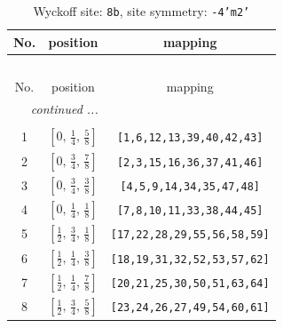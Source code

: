 \documentclass[fleqn,8pt]{jsarticle}
\begin{document}
\begin{longtable}{ccc}
\caption{Wyckoff site: {\tt 8b}, site symmetry: {\tt -4'm2'}}
 \\
 \hline \hline
No. & position & mapping \\ \hline \endfirsthead

\multicolumn{2}{l}{\tablename\ \thetable{}} \\
 \hline \hline
No. & position & mapping \\ \hline \endhead

 \hline \hline
\multicolumn{2}{r}{\footnotesize\it continued ...} \\ \endfoot

 \hline \hline
\multicolumn{2}{r}{} \\ \endlastfoot

1 & $\left[ 0,\, \frac{1}{4},\, \frac{5}{8} \right]$ & {\tt [1,6,12,13,39,40,42,43]} \\ \hline
2 & $\left[ 0,\, \frac{3}{4},\, \frac{7}{8} \right]$ & {\tt [2,3,15,16,36,37,41,46]} \\ \hline
3 & $\left[ 0,\, \frac{3}{4},\, \frac{3}{8} \right]$ & {\tt [4,5,9,14,34,35,47,48]} \\ \hline
4 & $\left[ 0,\, \frac{1}{4},\, \frac{1}{8} \right]$ & {\tt [7,8,10,11,33,38,44,45]} \\ \hline
5 & $\left[ \frac{1}{2},\, \frac{3}{4},\, \frac{1}{8} \right]$ & {\tt [17,22,28,29,55,56,58,59]} \\ \hline
6 & $\left[ \frac{1}{2},\, \frac{1}{4},\, \frac{3}{8} \right]$ & {\tt [18,19,31,32,52,53,57,62]} \\ \hline
7 & $\left[ \frac{1}{2},\, \frac{1}{4},\, \frac{7}{8} \right]$ & {\tt [20,21,25,30,50,51,63,64]} \\ \hline
8 & $\left[ \frac{1}{2},\, \frac{3}{4},\, \frac{5}{8} \right]$ & {\tt [23,24,26,27,49,54,60,61]} \\
\end{longtable}
\renewcommand{\arraystretch}{1.2}
\end{document}
